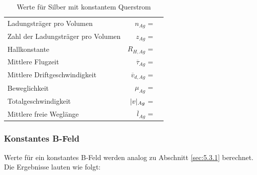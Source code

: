 \begin{table}[H]
\centering
    \begin{tabular}{l r l}
    \toprule
        Ladungsträger pro Volumen               &$n_{Ag}$               = & \text{}  \\
        Zahl der Ladungsträger pro Volumen      &$z_{Ag}$               = & \text{}  \\
        Hallkonstante                           &$R_{H,Ag}$             = & \text{} \\
        Mittlere Flugzeit                       &$\overline{\tau}_{Ag}$ = & \text{}\\
        Mittlere Driftgeschwindigkeit           &$\overline{v}_{d,Ag}$  = & \text{}\\
        Beweglichkeit                           &$\mu_{Ag}$             = & \text{} \\
        Totalgeschwindigkeit                    &$\lvert v\rvert_{Ag}$         = & \text{}  \\
        Mittlere freie Weglänge                 &$\overline{l}_{Ag}$    = & \text{}  \\
        \bottomrule
    \end{tabular}
\caption{Werte für Silber mit konstantem Querstrom}
\label{tab:6}
\end{table}

\subsubsection{Konstantes B-Feld} \label{sec:5.4.2}

\justifying Werte für ein konstantes B-Feld werden analog zu Abschnitt \ref{sec:5.3.1} berechnet. 
Die Ergebnisse lauten wie folgt:

